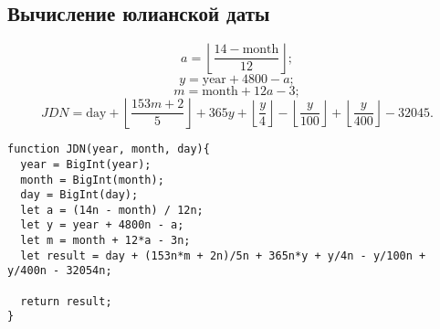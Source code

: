 \subsection{Вычисление юлианской даты}
$$a = \left\lfloor\frac{14 - \text{month}}{12}\right\rfloor;$$
$$y = \text{year} + 4800 - a;$$
$$m = \text{month} + 12a - 3;$$
$$J\!D\!N = \text{day} + \left\lfloor\frac{153m+2}{5}\right\rfloor +365y+\left\lfloor\frac{y}{4}\right\rfloor -\left\lfloor\frac{y}{100}\right\rfloor +\left\lfloor\frac{y}{400}\right\rfloor -32045.$$

\begin{lstlisting}
function JDN(year, month, day){
  year = BigInt(year);
  month = BigInt(month);
  day = BigInt(day);
  let a = (14n - month) / 12n;
  let y = year + 4800n - a;
  let m = month + 12*a - 3n;
  let result = day + (153n*m + 2n)/5n + 365n*y + y/4n - y/100n + y/400n - 32054n;
  
  return result;
}
\end{lstlisting}